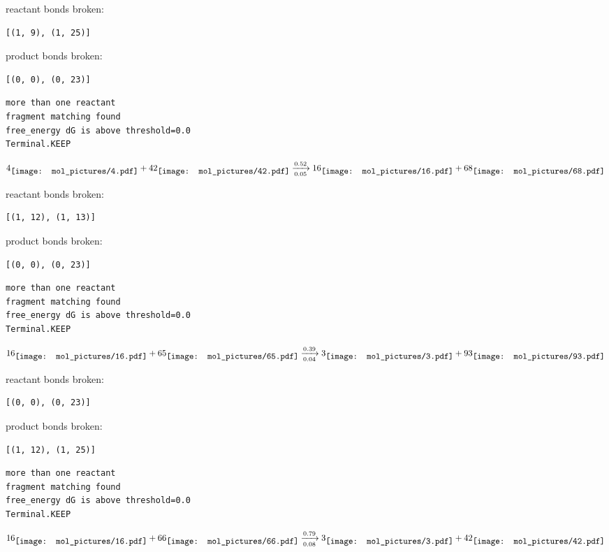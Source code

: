 \documentclass{article}
\begin{document}
reactant bonds broken:\begin{verbatim}
[(1, 9), (1, 25)]
\end{verbatim}
product bonds broken:\begin{verbatim}
[(0, 0), (0, 23)]
\end{verbatim}




\vspace{1cm}
\begin{verbatim}
more than one reactant
fragment matching found
free_energy dG is above threshold=0.0
Terminal.KEEP
\end{verbatim}
$$
4
\raisebox{-.5\height}{\texttt{[image: mol\_pictures/4.pdf]}}
+
42
\raisebox{-.5\height}{\texttt{[image: mol\_pictures/42.pdf]}}
\xrightarrow[0.05]{0.52}
16
\raisebox{-.5\height}{\texttt{[image: mol\_pictures/16.pdf]}}
+
68
\raisebox{-.5\height}{\texttt{[image: mol\_pictures/68.pdf]}}
$$


reactant bonds broken:\begin{verbatim}
[(1, 12), (1, 13)]
\end{verbatim}
product bonds broken:\begin{verbatim}
[(0, 0), (0, 23)]
\end{verbatim}




\vspace{1cm}
\begin{verbatim}
more than one reactant
fragment matching found
free_energy dG is above threshold=0.0
Terminal.KEEP
\end{verbatim}
$$
16
\raisebox{-.5\height}{\texttt{[image: mol\_pictures/16.pdf]}}
+
65
\raisebox{-.5\height}{\texttt{[image: mol\_pictures/65.pdf]}}
\xrightarrow[0.04]{0.39}
3
\raisebox{-.5\height}{\texttt{[image: mol\_pictures/3.pdf]}}
+
93
\raisebox{-.5\height}{\texttt{[image: mol\_pictures/93.pdf]}}
$$


reactant bonds broken:\begin{verbatim}
[(0, 0), (0, 23)]
\end{verbatim}
product bonds broken:\begin{verbatim}
[(1, 12), (1, 25)]
\end{verbatim}




\vspace{1cm}
\begin{verbatim}
more than one reactant
fragment matching found
free_energy dG is above threshold=0.0
Terminal.KEEP
\end{verbatim}
$$
16
\raisebox{-.5\height}{\texttt{[image: mol\_pictures/16.pdf]}}
+
66
\raisebox{-.5\height}{\texttt{[image: mol\_pictures/66.pdf]}}
\xrightarrow[0.08]{0.79}
3
\raisebox{-.5\height}{\texttt{[image: mol\_pictures/3.pdf]}}
+
42
\raisebox{-.5\height}{\texttt{[image: mol\_pictures/42.pdf]}}
$$
\end{document}
